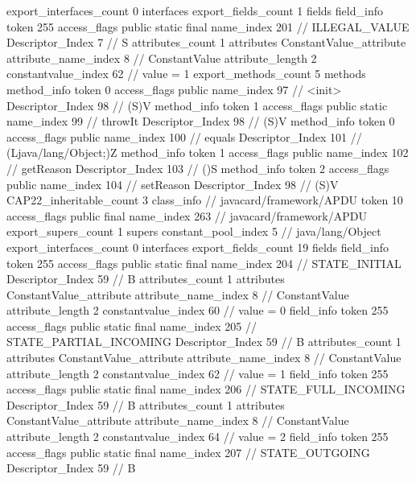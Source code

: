 {{{{			}
			export_interfaces_count	0
			interfaces {
			}
			export_fields_count	1
			fields {
			field_info {
				token	255
				access_flags	public static final
				name_index	201		// ILLEGAL_VALUE
				Descriptor_Index	7		// S
				attributes_count	1
				attributes {
				ConstantValue_attribute {
					attribute_name_index	8		// ConstantValue
					attribute_length	2
					constantvalue_index	62		// value = 1
				}
				}
			}
			}
			export_methods_count	5
			methods {
				method_info {
					token	0
					access_flags	public
					name_index	97		// <init>
					Descriptor_Index	98		// (S)V
				}
				method_info {
					token	1
					access_flags	public static
					name_index	99		// throwIt
					Descriptor_Index	98		// (S)V
				}
				method_info {
					token	0
					access_flags	public
					name_index	100		// equals
					Descriptor_Index	101		// (Ljava/lang/Object;)Z
				}
				method_info {
					token	1
					access_flags	public
					name_index	102		// getReason
					Descriptor_Index	103		// ()S
				}
				method_info {
					token	2
					access_flags	public
					name_index	104		// setReason
					Descriptor_Index	98		// (S)V
				}
			}
			CAP22_inheritable_count	3
		}
		class_info {		// javacard/framework/APDU
			token	10
			access_flags	public final
			name_index	263		// javacard/framework/APDU
			export_supers_count	1
			supers {
				constant_pool_index	5		// java/lang/Object
			}
			export_interfaces_count	0
			interfaces {
			}
			export_fields_count	19
			fields {
			field_info {
				token	255
				access_flags	public static final
				name_index	204		// STATE_INITIAL
				Descriptor_Index	59		// B
				attributes_count	1
				attributes {
				ConstantValue_attribute {
					attribute_name_index	8		// ConstantValue
					attribute_length	2
					constantvalue_index	60		// value = 0
				}
				}
			}
			field_info {
				token	255
				access_flags	public static final
				name_index	205		// STATE_PARTIAL_INCOMING
				Descriptor_Index	59		// B
				attributes_count	1
				attributes {
				ConstantValue_attribute {
					attribute_name_index	8		// ConstantValue
					attribute_length	2
					constantvalue_index	62		// value = 1
				}
				}
			}
			field_info {
				token	255
				access_flags	public static final
				name_index	206		// STATE_FULL_INCOMING
				Descriptor_Index	59		// B
				attributes_count	1
				attributes {
				ConstantValue_attribute {
					attribute_name_index	8		// ConstantValue
					attribute_length	2
					constantvalue_index	64		// value = 2
				}
				}
			}
			field_info {
				token	255
				access_flags	public static final
				name_index	207		// STATE_OUTGOING
				Descriptor_Index	59		// B
}}}}}
